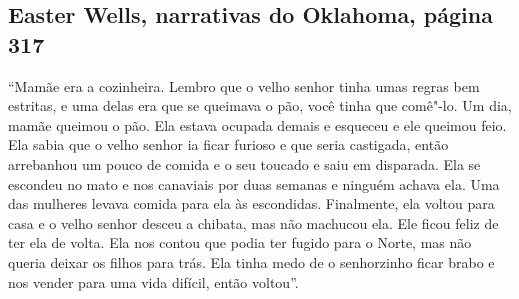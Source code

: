 \subsection{Easter Wells, narrativas do Oklahoma, página 317}
\label{ref281}

``Mamãe era a cozinheira. Lembro que o velho senhor tinha umas regras
bem estritas, e uma delas era que se queimava o pão, você tinha que
comê"-lo. Um dia, mamãe queimou o pão. Ela estava ocupada demais e
esqueceu e ele queimou feio. Ela sabia que o velho senhor ia ficar
furioso e que seria castigada, então arrebanhou um pouco de comida e o
seu toucado e saiu em disparada. Ela se escondeu no mato e nos canaviais
por duas semanas e ninguém achava ela. Uma das mulheres levava comida
para ela às escondidas. Finalmente, ela voltou para casa e o velho
senhor desceu a chibata, mas não machucou ela. Ele ficou feliz de ter
ela de volta. Ela nos contou que podia ter fugido para o Norte, mas não
queria deixar os filhos para trás. Ela tinha medo de o senhorzinho ficar
brabo e nos vender para uma vida difícil, então voltou''.

